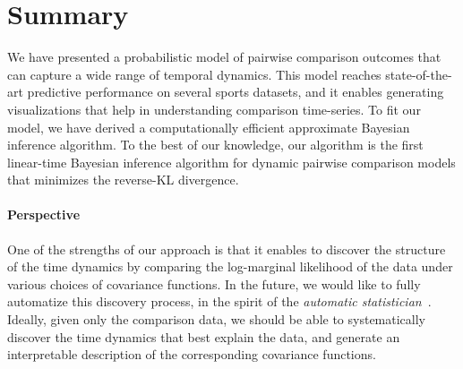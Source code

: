 \section{Summary}
\label{kks:sec:summary}

We have presented a probabilistic model of pairwise comparison outcomes that can capture a wide range of temporal dynamics.
This model reaches state-of-the-art predictive performance on several sports datasets, and it enables generating visualizations that help in understanding comparison time-series.
To fit our model, we have derived a computationally efficient approximate Bayesian inference algorithm.
To the best of our knowledge, our algorithm is the first linear-time Bayesian inference algorithm for dynamic pairwise comparison models that minimizes the reverse-KL divergence.

\paragraph{Perspective}
One of the strengths of our approach is that it enables to discover the structure of the time dynamics by comparing the log-marginal likelihood of the data under various choices of covariance functions.
In the future, we would like to fully automatize this discovery process, in the spirit of the \emph{automatic statistician}~\citep{duvenaud2014automatic}.
Ideally, given only the comparison data, we should be able to systematically discover the time dynamics that best explain the data, and generate an interpretable description of the corresponding covariance functions.
